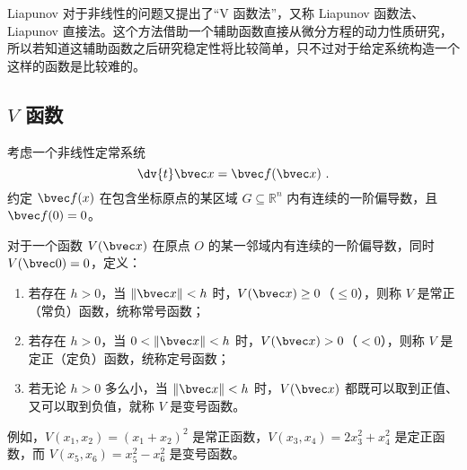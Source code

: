 
Liapunov 对于非线性的问题又提出了“V 函数法”，又称 Liapunov 函数法、Liapunov 直接法。这个方法借助一个辅助函数直接从微分方程的动力性质研究，所以若知道这辅助函数之后研究稳定性将比较简单，只不过对于给定系统构造一个这样的函数是比较难的。



\subsection{$V$ 函数}
考虑一个非线性定常系统 
\begin{equation}
\dv{t} \bvec x = \bvec f(\bvec x) ~.
\end{equation}
约定 $\bvec f(x)$ 在包含坐标原点的某区域 $G \subseteq \mathbb R^n$ 内有连续的一阶偏导数，且 $\bvec f(0) = 0$。

\begin{definition}{}
对于一个函数 $ V(\bvec x)$ 在原点 $O$ 的某一邻域内有连续的一阶偏导数，同时 $ V(\bvec 0 ) = 0$，定义：
\begin{enumerate}
\item 若存在 $h>0$，当 $\Vert \bvec x \Vert < h$ 时，$V(\bvec x) \ge 0$（$\le 0$），则称 $V$ 是常正（常负）函数，统称常号函数；
\item 若存在 $h > 0$，当 $0 < \Vert \bvec x \Vert < h$ 时，$V(\bvec x) > 0$（$< 0$），则称 $V$ 是定正（定负）函数，统称定号函数；
\item 若无论 $h > 0$ 多么小，当 $\Vert \bvec x \Vert < h$ 时，$V(\bvec x)$ 都既可以取到正值、又可以取到负值，就称 $V$ 是变号函数。
\end{enumerate}

\end{definition}

例如，$V(x_1, x_2) = (x_1 + x_2)^2$ 是常正函数，$V(x_3, x_4) = 2 x_3^2 + x_4^2$ 是定正函数，而 $V(x_5, x_6) = x_5^2 - x_6^2$ 是变号函数。

